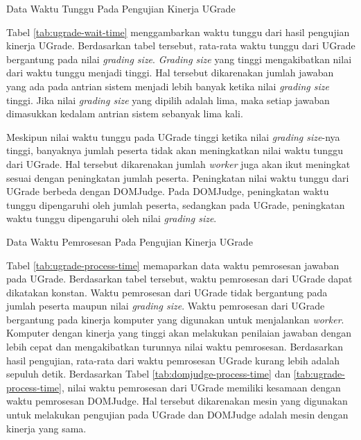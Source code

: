 \begin{table}[ht!]
    \centering
    
    \caption{Data Waktu Tunggu Pada Pengujian Kinerja UGrade}
    \label{tab:ugrade-wait-time}
\end{table}

\par Tabel \ref{tab:ugrade-wait-time} menggambarkan waktu tunggu dari hasil pengujian kinerja UGrade. Berdasarkan tabel tersebut, rata-rata waktu tunggu dari UGrade bergantung pada nilai \textit{grading size}. \textit{Grading size} yang tinggi mengakibatkan nilai dari waktu tunggu menjadi tinggi. Hal tersebut dikarenakan jumlah jawaban yang ada pada antrian sistem menjadi lebih banyak ketika nilai \textit{grading size} tinggi. Jika nilai \textit{grading size} yang dipilih adalah lima, maka setiap jawaban dimasukkan kedalam antrian sistem sebanyak lima kali.

\par Meskipun nilai waktu tunggu pada UGrade tinggi ketika nilai \textit{grading size}-nya tinggi, banyaknya jumlah peserta tidak akan meningkatkan nilai waktu tunggu dari UGrade. Hal tersebut dikarenakan jumlah \textit{worker} juga akan ikut meningkat sesuai dengan peningkatan jumlah peserta. Peningkatan nilai waktu tunggu dari UGrade berbeda dengan DOMJudge. Pada DOMJudge, peningkatan waktu tunggu dipengaruhi oleh jumlah peserta, sedangkan pada UGrade, peningkatan waktu tunggu dipengaruhi oleh nilai \textit{grading size}.

\begin{table}[ht!]
    \centering
    
    \caption{Data Waktu Pemrosesan Pada Pengujian Kinerja UGrade}
    \label{tab:ugrade-process-time}
\end{table}

\par Tabel \ref{tab:ugrade-process-time} memaparkan data waktu pemrosesan jawaban pada UGrade. Berdasarkan tabel tersebut, waktu pemrosesan dari UGrade dapat dikatakan konstan. Waktu pemrosesan dari UGrade tidak bergantung pada jumlah peserta maupun nilai \textit{grading size}. Waktu pemrosesan dari UGrade bergantung pada kinerja komputer yang digunakan untuk menjalankan \textit{worker}. Komputer dengan kinerja yang tinggi akan melakukan penilaian jawaban dengan lebih cepat dan mengakibatkan turunnya nilai waktu pemrosesan. Berdasarkan hasil pengujian, rata-rata dari waktu pemrosesan UGrade kurang lebih adalah sepuluh detik. Berdasarkan Tabel \ref{tab:domjudge-process-time} dan \ref{tab:ugrade-process-time}, nilai waktu pemrosesan dari UGrade memiliki kesamaan dengan waktu pemrosesan DOMJudge. Hal tersebut dikarenakan mesin yang digunakan untuk melakukan pengujian pada UGrade dan DOMJudge adalah mesin dengan kinerja yang sama.

